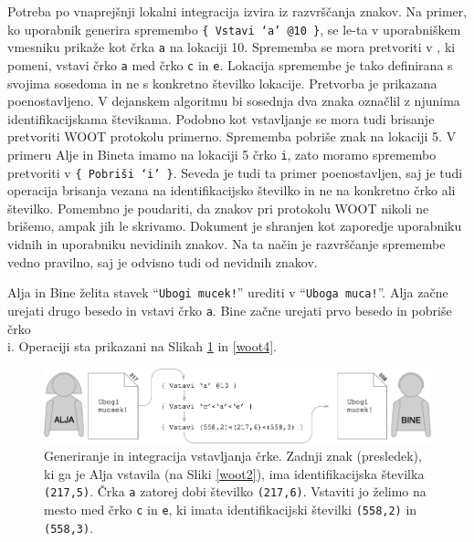 \documentclass[a4paper, 12pt, twoside]{book}
\begin{document}
Potreba po vnaprejšnji lokalni integracija izvira iz razvrščanja znakov. Na primer, ko uporabnik generira spremembo {\tt \{ Vstavi ‘a’ @10 \}}, se le-ta v uporabniškem vmesniku prikaže kot črka {\tt a} na lokaciji 10. Sprememba se mora pretvoriti v , ki pomeni, vstavi črko {\tt a} med črko {\tt c} in {\tt e}. Lokacija spremembe je tako definirana s svojima sosedoma in ne s konkretno številko lokacije. Pretvorba je prikazana poenostavljeno. V dejanskem algoritmu bi sosednja dva znaka označlil z njunima identifikacijskama števikama. Podobno kot vstavljanje se mora tudi brisanje pretvoriti WOOT protokolu primerno. Sprememba  pobriše znak na lokaciji 5. V primeru Alje in Bineta imamo na lokaciji 5 črko {\tt i}, zato moramo spremembo pretvoriti v {\tt \{ Pobriši ‘i’ \}}. Seveda je tudi ta primer poenostavljen, saj je tudi operacija brisanja vezana na identifikacijsko številko in ne na konkretno črko ali številko. Pomembno je poudariti, da znakov pri protokolu WOOT nikoli ne brišemo, ampak jih le skrivamo. Dokument je shranjen kot zaporedje uporabniku vidnih in uporabniku nevidinih znakov. Na ta način je razvrščanje spremembe vedno pravilno, saj je odvisno tudi od nevidnih znakov.

Alja in Bine želita stavek “{\tt Ubogi mucek!}” urediti v “{\tt Uboga muca!}”. Alja začne urejati drugo besedo in vstavi črko {\tt a}. Bine začne urejati prvo besedo in pobriše črko {\\ i}. Operaciji sta prikazani na Slikah \ref{woot3} in \ref{woot4}.

\begin{figure}[placement h]
\begin{center}
\includegraphics[width=13cm]{woot3.png}
\end{center}
\caption{Generiranje in integracija vstavljanja črke. Zadnji znak (presledek), ki ga je Alja vstavila (na Sliki \ref{woot2}), ima identifikacijska številka {\tt (217,5)}. Črka {\tt a} zatorej dobi številko {\tt (217,6)}. Vstaviti jo želimo na mesto med črko {\tt c} in {\tt e}, ki imata identifikacijski številki {\tt (558,2)} in {\tt (558,3)}.}
\label{woot3}
\end{figure}
\end{document}
